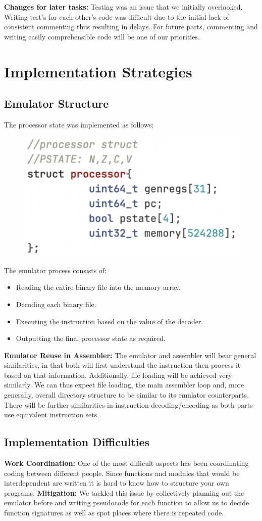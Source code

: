 \documentclass[11pt]{article}
\begin{document}
\textbf{Changes for later tasks:} Testing was an issue that we initially overlooked. Writing test's for each other's code was difficult due to the initial lack of consistent commenting thus resulting in delays. For future parts, commenting and writing easily comprehensible code will be one of our priorities.

\section{Implementation Strategies}
\subsection{Emulator Structure}
The processor state was implemented as follows:

\begin{figure}[ht]
        \centering
        \includegraphics[width=0.3\linewidth]{struct}
\end{figure}

The emulator process consists of:
\begin{itemize}
        \item Reading the entire binary file into the memory array.
        \item Decoding each binary file.
        \item Executing the instruction based on the value of the decoder.
        \item Outputting the final processor state as required.
\end{itemize}

\textbf{Emulator Reuse in Assembler:} The emulator and assembler will bear general similarities, in that both will first understand the instruction then process it based on that information. Additionally, file loading will be achieved very similarly. We can thus expect file loading, the main assembler loop and, more generally, overall directory structure to be similar to its emulator counterparts. There will be further similarities in instruction decoding/encoding as both parts use equivalent instruction sets.

\subsection{Implementation Difficulties}
\textbf{Work Coordination:} One of the most difficult aspects has been coordinating coding between different people. Since functions and modules that would be interdependent are written it is hard to know how to structure your own programs. \textbf{Mitigation:} We tackled this issue by collectively planning out the emulator before and writing pseudocode for each function to allow us to decide function signatures as well as spot places where there is repeated code.
\end{document}
